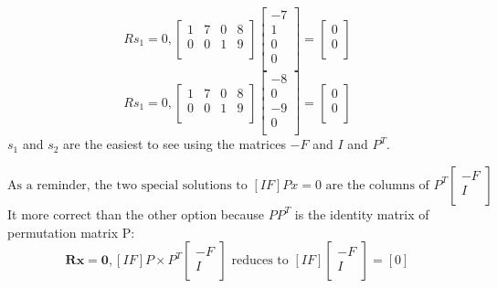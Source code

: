 \[
    Rs_1 = 0,
    \begin{bmatrix}
        1 & 7 & 0 & 8  \\
        0 & 0 & 1 & 9  \\
    \end{bmatrix}
    \begin{bmatrix}
        -7 \\
        1  \\
        0  \\
        0  \\
    \end{bmatrix}
    = 
    \begin{bmatrix}
        0 \\
        0 \\
    \end{bmatrix}
\]
\[
    Rs_1 = 0,
    \begin{bmatrix}
        1 & 7 & 0 & 8  \\
        0 & 0 & 1 & 9  \\
    \end{bmatrix}
    \begin{bmatrix}
        -8 \\
        0  \\
        -9  \\
        0  \\
    \end{bmatrix}
    = 
    \begin{bmatrix}
        0 \\
        0 \\
    \end{bmatrix}
\]
\(s_1\) and \(s_2\) are the easiest to see using the matrices \(-F\) and \(I\) and \(P^T\). 

\[
    \text{As a reminder, the two special solutions to }
    [I F] P x = 0
    \text{ are the columns of }
    P^T 
    \begin{bmatrix}
         -F \\
          I \\
    \end{bmatrix}
\]
It more correct than the other option because \(P P^T\) is the identity matrix of permutation matrix P:
\[
    \mathbf{Rx = 0, }
    [I F] P 
    \times
    P^T 
    \begin{bmatrix}
         -F \\
         I \\
    \end{bmatrix}
    \text{ reduces to }
    [I F]
    \begin{bmatrix}
         -F \\
          I \\
    \end{bmatrix}
    = 
    [0]
\] 

